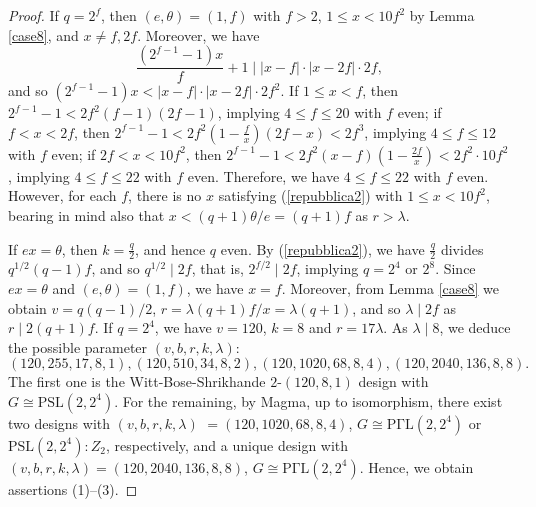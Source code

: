 \documentclass[a4paper,twopage,reqno,12pt]{amsart}
\theoremstyle{definition}
\numberwithin{equation}{section}
\newcommand{\PSL}{\mathrm{PSL}}
\newcommand{\PGaL}{\mathrm{P\Gamma L}}
\renewcommand{\leq}{\leqslant}
\begin{document}
\begin{proof}
If $q=2^{f}$, then $(e,\theta )=(1,f)$ with $f>2$,
 $1\le x< 10f^2$ by Lemma \ref{case8}, and $x \neq f,2f$. 
Moreover, we have 
\[
\frac{\left( 2^{f-1}-1\right)x}{f}+1
\mid 
|x-f|\cdot |x-2f| \cdot2f,
\]
and so 
$(2^{f-1}-1)x<|x-f|\cdot |x-2f| \cdot2f^2$.
If $1\le x <f$, then 
$2^{f-1}-1<2f^{2}(f-1)(2f-1)$, implying 
$4\le f\le 20$ with $f$ even;
if $f<x<2f$, then 
$2^{f-1}-1<2f^{2}(1-\frac{f}{x})(2f-x)<2f^3$,  implying 
$4\le f\le 12$ with $f$ even;
if $2f<x<10f^2$, then 
$2^{f-1}-1<2f^{2}(x-f)(1-\frac{2f}{x})<2f^2\cdot 10f^2$,  implying 
$4\le f\le 22$ with $f$ even.
Therefore, we have $4\le f\le 22$ with $f$ even.
However, for each $f$, there is no $x$ satisfying  
(\ref{repubblica2}) with $1\le x<10f^2$, bearing in mind also that $x<(q+1)\theta/e=(q+1)f$ as $r>\lambda$.



If $ex=\theta $, then $k=\frac{q}{2}$, 
and hence $q$ even. By (\ref{repubblica2}),
we have $\frac{q}{2}$ divides $q^{1/2}(q-1)f$, 
and so $q^{1/2}\mid 2f$, that is, $2^{f/2}\mid 2f$,
implying $q=2^4$ or $2^8$.
Since $ex=\theta$ and $(e,\theta)=(1,f)$, we have 
$x=f$. Moreover, from Lemma \ref{case8} we obtain $v=q(q-1)/2$, $r=\lambda(q+1)f/x=\lambda(q+1)$, 
and so $\lambda \mid 2f$ as $r\mid 2(q+1)f$. 
If $q=2^4$, we have $v=120$, $k=8$ and $r=17\lambda$. 
As $\lambda \mid 8$, we deduce the possible parameter $(v,b,r,k,\lambda)$:
\[
(120,255,17,8,1), (120,510,34,8,2), 
(120,1020,68,8,4), (120,2040,136,8,8).
\]
The first one is the Witt-Bose-Shrikhande $2$-$(120,8,1)$ design with $G\cong \PSL(2,2^{4})$.
For the remaining, by Magma, up to isomorphism, 
there exist two designs with 
$(v,b,r,k,\lambda)$ $=(120,1020,68,8,4)$, 
$G\cong \PGaL(2,2^{4})$ or $\PSL(2,2^4):Z_2$, respectively,
and a unique design with 
$(v,b,r,k,\lambda)=(120,2040,136,8,8)$, 
$G\cong \PGaL(2,2^{4})$. Hence, we obtain assertions (1)--(3).



\end{proof}
\end{document}
